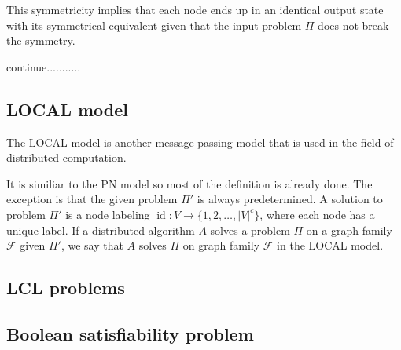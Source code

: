 

This symmetricity implies that each node ends up in an identical output state with its symmetrical equivalent given that the input problem $\Pi$ does not break the symmetry.

continue...........

\subsection{LOCAL model} \label{sec:local_model}
The LOCAL model is another message passing model that is used in the field of distributed computation.

It is similiar to the PN model so most of the definition is already done.
The exception is that the given problem $\Pi'$ is always predetermined.
A solution to problem $\Pi'$ is a node labeling $\operatorname{id}\colon V \rightarrow \{1,2,\dotsc,|V|^c\}$, where each node has a unique label.
If a distributed algorithm $A$ solves a problem $\Pi$ on a graph family $\mathcal{F}$ given $\Pi'$, we say that $A$ solves $\Pi$ on graph family $\mathcal{F}$ in the LOCAL model.


\subsection{LCL problems} \label{sec:lcl_problems}

\subsection{Boolean satisfiability problem}


\clearpage

